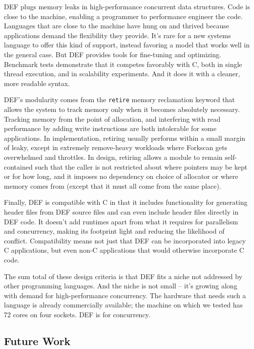 DEF plugs memory leaks in high-performance concurrent data structures.  Code is close to the machine, enabling a programmer to performance engineer the code.  Languages that are close to the machine have hung on and thrived because applications demand the flexibility they provide.  It's rare for a new systems language to offer this kind of support, instead favoring a model that works well in the general case.  But DEF provides tools for fine-tuning and optimizing.  Benchmark tests demonstrate that it competes favorably with C, both in single thread execution, and in scalability experiments.  And it does it with a cleaner, more readable syntax.

DEF's modularity comes from the \texttt{retire} memory reclamation keyword that allows the system to track memory only when it becomes absolutely necessary.  Tracking memory from the point of allocation, and interfering with read performance by adding write instructions are both intolerable for some applications.  In implementation, retiring usually performs within a small margin of leaky, except in extremely remove-heavy workloads where Forkscan gets overwhelmed and throttles.  In design, retiring allows a module to remain self-contained such that the caller is not restricted about where pointers may be kept or for how long, and it imposes no dependency on choice of allocator or where memory comes from (except that it must all come from the same place).

Finally, DEF is compatible with C in that it includes functionality for generating header files from DEF source files and can even include header files directly in DEF code.  It doesn't add runtimes apart from what it requires for parallelism and concurrency, making its footprint light and reducing the likelihood of conflict.  Compatibility means not just that DEF can be incorporated into legacy C applications, but even non-C applications that would otherwise incorporate C code.

The sum total of these design criteria is that DEF fits a niche not addressed by other programming languages.  And the niche is not small -- it's growing along with demand for high-performance concurrency.  The hardware that needs such a language is already commercially available; the machine on which we tested has 72 cores on four sockets.  DEF is for concurrency.

\subsection{Future Work}


